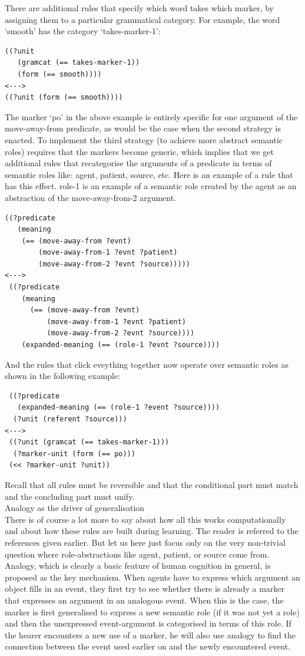 There are additional rules that specify which word takes which marker, by assigning them to a particular 
grammatical category. For example, the word `smooth' has the category `takes-marker-1': 
\begin{verbatim}
((?unit
   (gramcat (== takes-marker-1)) 
   (form (== smooth))))
<---> 
((?unit (form (== smooth))))
\end{verbatim}

The marker `po' in the above example is entirely specific for one argument of the move-away-from predicate, as would be the 
case when the second strategy is enacted. To implement the third strategy 
(to achieve more abstract semantic roles) requires that the markers become generic, which implies that 
we get additional rules that recategorise the arguments of a predicate in terms of 
semantic roles like: agent, patient, source, etc. Here is an example of a rule that 
has this effect. role-1 is an example of a semantic role created by the agent as an abstraction of the 
move-away-from-2 argument. 
\begin{verbatim}
((?predicate
   (meaning
    (== (move-away-from ?evnt) 
        (move-away-from-1 ?evnt ?patient)
        (move-away-from-2 ?evnt ?source)))))
<---> 
 ((?predicate
    (meaning
      (== (move-away-from ?evnt)
          (move-away-from-1 ?evnt ?patient)
          (move-away-from-2 ?evnt ?source)))) 
    (expanded-meaning (== (role-1 ?evnt ?source))))
\end{verbatim}
And the rules that click eveything together now operate over semantic roles as shown in the following example: 
\begin{verbatim}
 ((?predicate
   (expanded-meaning (== (role-1 ?event ?source))))
  (?unit (referent ?source))) 
<---> 
 ((?unit (gramcat (== takes-marker-1)))
  (?marker-unit (form (== po))) 
 (<< ?marker-unit ?unit))
\end{verbatim}
Recall that all rules must be reversible and that the conditional part must match and the concluding part must unify.\\

{\bfshape  Analogy as the driver of generalisation}\\

There is of course a lot more to say about how all this works computationally and about how these rules are built during 
learning. The reader is referred to the references given earlier. 
But let us here just focus only on the very non-trivial question where role-abstractions 
like agent, patient, or source come from. Analogy, which is clearly a basic feature of human 
cognition in general, is proposed as the key mechanism.  When agents have to 
express which argument an object fills in an event, they first try to see whether there is already a marker that 
expresses an argument in an analogous event. When this is the case, the marker is first generalised to 
express a new semantic role (if it was not yet a role) and then the unexpressed event-argument is 
categorised in terms of this role. If the hearer encounters a new use of a marker, he will also use analogy to 
find the connection between the event used earlier on and the newly encountered event.

